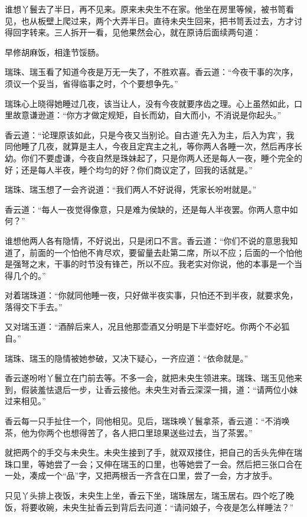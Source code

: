 \documentclass[a4paper,12pt,UTF8,twoside]{ctexbook}
\begin{document}
谁想丫鬟去了半日，再不见来。原来未央生不在家。他坐在房里等候，被书笥看见，也从板壁上爬过来，两个大弄半日。直待未央生回来，把书笥丢过去，方才讨得回字转来。三人拆开一看，见他果然会心，就在原诗后面续两句道：

早修胡麻饭，相逢节馁肠。

瑞珠、瑞玉看了知道今夜是万无一失了，不胜欢喜。香云道：“今夜干事的次序，须议一个妥当，省得临事之时，个个要想争先。”

瑞珠心上晓得她睡过几夜，该当让人，没有今夜就要序齿之理。心上虽然如此，口里故意谦逊道：“你方才做定规矩，自长而幼，自大而小，不消说是你起头。”

香云道：“论理原该如此，只是今夜又当别论。自古道‘先入为主，后入为宾’，我同他睡了几夜，就算是主人，今夜且定宾主之礼，等你两人各睡一次，然后再序长幼。你们不要虚谦，今夜自然是珠妹起了，只是你两人还是每人一夜，睡个完全的好；还是每人半夜，睡个均匀的好？你们商议定了，回我的话就是。”

瑞珠、瑞玉想了一会齐说道：“我们两人不好说得，凭家长吩咐就是。”

香云道：“每人一夜觉得像意，只是难为侯缺的，还是每人半夜罢。你两人意中如何？”

谁想他两人各有隐情，不好说出，只是闭口不言。香云道：“你们不说的意思我知道了，前面的一个怕他不肯尽欢，要留量去赴第二席，所以不应；后面的一个怕他是强弩之末，干事的时节没有锋芒，所以不应。我老实对你说，他的本事是一个当得几个的。”

对着瑞珠道：“你就同他睡一夜，只好做半夜实事，只怕还不到半夜，就要求免，落得交下手去。”

又对瑞玉道：“酒醉后来人，况且他那壶酒又分明是下半壶好吃。你两个不必狐自。”

瑞珠、瑞玉的隐情被她参破，又决下疑心，一齐应道：“依命就是。”

香云遂吩咐丫鬟立在门前去等。不多一会，就把未央生领进来。瑞珠、瑞玉见他来到，假装羞怯退后一步，让香云接他。未央生对香云深深一揖，道：“请两位小妹过来相见。”

香云每一只手扯住一个，同他相见。见后，瑞珠唤丫鬟拿茶，香云道：“不消唤茶，他为你两个也想得苦了，各人把口里琼果送些过去，当了茶罢。”

就把两个的手交与未央生。未央生接到了手，就双双搂住，把自己的舌头先伸在瑞珠口里，等她尝了一会；又伸在瑞玉的口里，也等她尝了一会。然后把三张口合在一处，凑成一个“品”字，又把两根舌一齐含在口里，尝了一会，方才放手。

只见丫头排上夜饭，未央生上坐，香云下坐，瑞珠居左，瑞玉居右。四个吃了晚饭，将要收碗，未央生扯香云到背后去问道：“请问娘子，今夜是怎么样睡法？”
\end{document}
